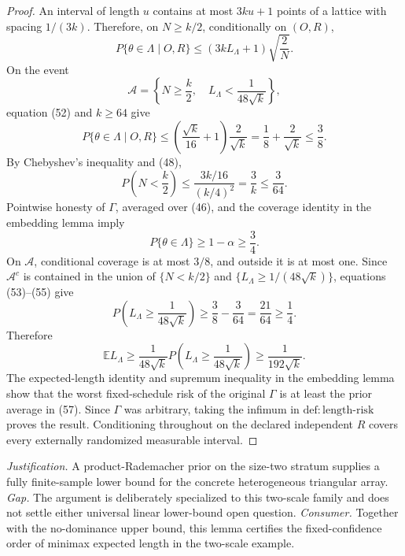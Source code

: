 \documentclass{article}
\begin{document}
\begin{proof}
An interval of length \(u\) contains at most \(3ku+1\) points of a lattice with spacing \(1/(3k)\). Therefore, on \(N\ge k/2\), conditionally on \((O,R)\),
\[
 P\{\theta\in\Lambda\mid O,R\}
 \le(3kL_\Lambda+1)\sqrt{\frac2N}.
\tag{52}
\]
On the event
\[
 \mathcal A=\left\{N\ge\frac k2,\quad
 L_\Lambda<\frac1{48\sqrt{k}}\right\},
\]
equation (52) and \(k\ge64\) give
\[
 P\{\theta\in\Lambda\mid O,R\}
 \le\left(\frac{\sqrt{k}}{16}+1\right)\frac2{\sqrt{k}}
 =\frac18+\frac2{\sqrt{k}}
 \le\frac38.
\tag{53}
\]
By Chebyshev's inequality and (48),
\[
 P\left(N<\frac k2\right)
 \le\frac{3k/16}{(k/4)^2}
 =\frac3k\le\frac3{64}.
\tag{54}
\]
Pointwise honesty of \(\Gamma\), averaged over (46), and the coverage identity in the embedding lemma imply
\[
 P\{\theta\in\Lambda\}\ge1-\alpha\ge\frac34.
\tag{55}
\]
On \(\mathcal A\), conditional coverage is at most \(3/8\), and outside it is at most one. Since \(\mathcal A^c\) is contained in the union of \(\{N<k/2\}\) and \(\{L_\Lambda\ge1/(48\sqrt{k})\}\), equations (53)--(55) give
\[
 P\left(L_\Lambda\ge\frac1{48\sqrt{k}}\right)
 \ge\frac38-\frac3{64}=\frac{21}{64}\ge\frac14.
\tag{56}
\]
Therefore
\[
 \mathbb E L_\Lambda
 \ge\frac1{48\sqrt{k}}
 P\left(L_\Lambda\ge\frac1{48\sqrt{k}}\right)
 \ge\frac1{192\sqrt{k}}.
\tag{57}
\]
The expected-length identity and supremum inequality in the embedding lemma show that the worst fixed-schedule risk of the original \(\Gamma\) is at least the prior average in (57). Since \(\Gamma\) was arbitrary, taking the infimum in \(\mathrm{def{:}length\text{-}risk}\) proves the result. Conditioning throughout on the declared independent \(R\) covers every externally randomized measurable interval.
\end{proof}
\par\smallskip\noindent \textit{Justification.} A product-Rademacher prior on the size-two stratum supplies a fully finite-sample lower bound for the concrete heterogeneous triangular array. \textit{Gap.} The argument is deliberately specialized to this two-scale family and does not settle either universal linear lower-bound open question. \textit{Consumer.} Together with the no-dominance upper bound, this lemma certifies the fixed-confidence order of minimax expected length in the two-scale example.
\end{document}
